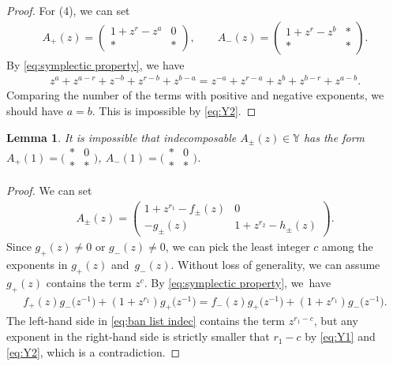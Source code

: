 \documentclass[10pt,a4paper]{amsart}
\numberwithin{equation}{section}
\newtheorem{Lemma}[Theorem]{Lemma}
\theoremstyle{definition}
\begin{document}
\begin{proof}
 For (4), we can set
 \begin{align*}
 A_+(z) =
 \begin{pmatrix}
 1 + z^r -z^a & 0 \\
 * & *
 \end{pmatrix},\qquad
 A_-(z) =
 \begin{pmatrix}
 1 + z^r - z^b & * \\
 * & *
 \end{pmatrix}.
 \end{align*}
 By \eqref{eq:symplectic property}, we have
 \begin{align*}
 z^{a} + z^{a-r} + z^{-b} + z^{r-b} + z^{b-a} =
 z^{-a} + z^{r-a} + z^{b} + z^{b-r} + z^{a-b}.
 \end{align*}
 Comparing the number of the terms with positive and negative exponents,
 we should have $a = b$. This is impossible by \eqref{eq:Y2}.
\end{proof}

\begin{Lemma}\label{lemma:ban list indec}
 It is impossible that indecomposable $A_\pm(z) \in \mathbb{Y}$ has the form
$
 A_+(1) =
 \bigl(\begin{smallmatrix}
 * & 0 \\
 * & *
\end{smallmatrix}\bigr)$, $
 A_-(1) =
 \bigl(\begin{smallmatrix}
 * & 0 \\
 * & *
\end{smallmatrix}\bigr)$.

\end{Lemma}
\begin{proof}
 We can set
 \begin{align*}
 A_\pm(z) =
 \begin{pmatrix}
 1 + z^{r_1} - f_\pm(z) & 0 \\
 -g_\pm(z) & 1+z^{r_2} -h_\pm(z)
 \end{pmatrix}.
 \end{align*}
 Since $g_+(z)\neq 0$ or $g_-(z)\neq 0$,
 we can pick the least integer $c$ among the exponents in $g_+(z)$ and~$g_-(z)$.
 Without loss of generality, we can assume $g_+(z)$ contains the term $z^c$.
 By \eqref{eq:symplectic property}, we~have
 \begin{align}\label{eq:ban list indec}
 f_+(z) g_-\bigl(z^{-1}\bigr) + (1+z^{r_1}) g_+ \bigl(z^{-1}\bigr)=
 f_-(z) g_+\bigl(z^{-1}\bigr) + (1+z^{r_1}) g_- \bigl(z^{-1}\bigr).
 \end{align}
 The left-hand side in \eqref{eq:ban list indec} contains the term $z^{r_1 - c}$,
 but any exponent in the right-hand side is strictly smaller that $r_1 - c$ by
 \eqref{eq:Y1} and \eqref{eq:Y2}, which is a contradiction.
\end{proof}
\end{document}

